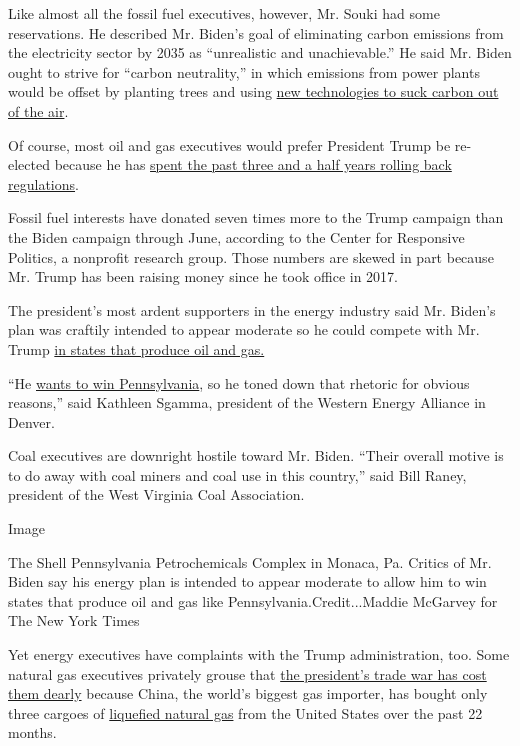Like almost all the fossil fuel executives, however, Mr. Souki had some
reservations. He described Mr. Biden's goal of eliminating carbon
emissions from the electricity sector by 2035 as ``unrealistic and
unachievable.'' He said Mr. Biden ought to strive for ``carbon
neutrality,'' in which emissions from power plants would be offset by
planting trees and using
\href{https://www.nytimes3xbfgragh.onion/2019/04/07/business/energy-environment/climate-change-carbon-engineering.html}{new
technologies to suck carbon out of the air}.

Of course, most oil and gas executives would prefer President Trump be
re-elected because he has
\href{https://www.nytimes3xbfgragh.onion/2020/07/15/climate/trump-biden-environment.html?action=click\&module=RelatedLinks\&pgtype=Article}{spent
the past three and a half years rolling back regulations}.

Fossil fuel interests have donated seven times more to the Trump
campaign than the Biden campaign through June, according to the Center
for Responsive Politics, a nonprofit research group. Those numbers are
skewed in part because Mr. Trump has been raising money since he took
office in 2017.

The president's most ardent supporters in the energy industry said Mr.
Biden's plan was craftily intended to appear moderate so he could
compete with Mr. Trump
\href{https://www.nytimes3xbfgragh.onion/2020/03/31/business/energy-environment/pennsylvania-shale-gas-fracking.html}{in
states that produce oil and gas.}

``He
\href{https://www.nytimes3xbfgragh.onion/2020/01/27/us/politics/pennsylvania-democrats-fracking.html}{wants
to win Pennsylvania}, so he toned down that rhetoric for obvious
reasons,'' said Kathleen Sgamma, president of the Western Energy
Alliance in Denver.

Coal executives are downright hostile toward Mr. Biden. ``Their overall
motive is to do away with coal miners and coal use in this country,''
said Bill Raney, president of the West Virginia Coal Association.

Image

The Shell Pennsylvania Petrochemicals Complex in Monaca, Pa. Critics of
Mr. Biden say his energy plan is intended to appear moderate to allow
him to win states that produce oil and gas like
Pennsylvania.Credit...Maddie McGarvey for The New York Times

Yet energy executives have complaints with the Trump administration,
too. Some natural gas executives privately grouse that
\href{https://www.nytimes3xbfgragh.onion/2020/01/15/business/energy-environment/china-trade-deal-energy.html}{the
president's trade war has cost them dearly} because China, the world's
biggest gas importer, has bought only three cargoes of
\href{https://www.nytimes3xbfgragh.onion/2020/05/11/business/energy-environment/natural-gas-exports-coronavirus.html}{liquefied
natural gas} from the United States over the past 22 months.

